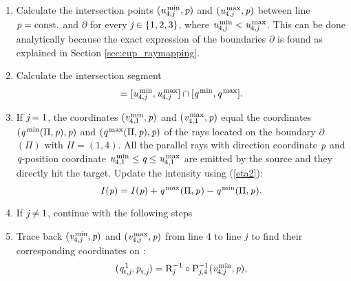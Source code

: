 \begin{enumerate}
\item Calculate the intersection points $(\textit{u}_{4,\textit{j}}^\textrm{\,min}, \textit{p})$ and $(\textit{u}_{4,\textit{j}}^\textrm{\,max}, \textit{p})$ between line $\textit{p}= \textrm{const.}$ and $\partial$ for every $\textit{j}\in\{1,2,3\}$, where $\textit{u}_{4,\textit{j}}^\textrm{\,min}<\textit{u}_{4,\textit{j}}^\textrm{\,max}$. This can be done analytically because the exact expression of the boundaries $\partial$ is found as explained in Section \ref{sec:cup_raymapping}.
\item Calculate the intersection segment 
\begin{equation*}
[\variabile{v}_{4, \lineai}^\textrm{\,min}, \variabile{v}_{4, \lineai}^\textrm{\,max}] = [\variabile{u}_{4, \lineai}^\textrm{\,min}, \variabile{u}_{4, \lineai}^\textrm{\,max}]\cap
 [\pos{}{}^\textrm{\,min}, \pos{}{}^\textrm{\,max}].
\end{equation*}
\item If $\textit{j}= 1$, the coordinates $(\textit{v}_{4,1}^\textrm{\,min}, \textit{p})$ and $(\textit{v}_{4,1}^\textrm{\,max}, \textit{p})$ equal the coordinates $(\textit{q}^\textrm{\,min}(\Pi, \textit{p}), \textit{p})$ and $(\textit{q}^\textrm{\,max}(\Pi, \textit{p}), \textit{p})$ of the rays located on the boundary $\partial$$(\Pi)$ with $\Pi = (1,4)$. All the parallel rays with direction coordinate $\textit{p}$ and $\textit{q}$-position coordinate $\textit{u}_{4,1}^\textrm{\,min}\leq \textit{q} \leq \textit{u}_{4,1}^\textrm{\,max}$ are emitted by the source and they directly hit the target. Update the intensity using (\ref{eta2}):
\begin{equation*}
I(\textit{p})= I(\textit{p})+\textit{q}^\textrm{\,max}(\Pi, \textit{p}_{\textrm{} \textit{}})-\textit{q}^\textrm{\,min}(\Pi, \textit{p}_{\textrm{} \textit{}}).
\end{equation*}
\item If $\textit{j}\neq 1$, continue with the following steps
\item Trace back $(\textit{v}_{4,\textit{j}}^\textrm{\,min}, \textit{p})$ and $(\textit{v}_{4,\textit{j}}^\textrm{\,max}, \textit{p})$ from line $4$ to line $\textit{j}$ to find their corresponding coordinates on :
\begin{equation*}
\begin{aligned}
(\pos{t,}{\lineai}^{\,1}, \dir{t,}{\lineai})& =\inversemap{R}{\lineai}{}\circ \inversemap{P}{\lineai,}{4}(\variabile{v}_{4,\lineai}^\textrm{\,min}, \variabile{p}),  \\

\end{aligned}
\end{equation*}
\end{enumerate}
